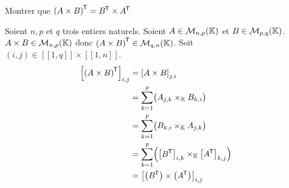 \documentclass{article}
\date{02 Janvier 2025}
\begin{document}
\maketitle

	{Montrer que $\left(A \times B\right)^{\mkern-1.5mu\mathsf{T}} = B^{\mkern-1.5mu\mathsf{T}} \times A^{\mkern-1.5mu\mathsf{T}}$}

	Soient $n,p$ et $q$ trois entiers naturels.
	Soient $A \in \mathcal{M}_{n,p}(\mathbb K)$ et $B\in \mathcal{M}_{p,q}(\mathbb K)$. \\
	$A \times B \in \mathcal{M}_{n,p}(\mathbb K)$ donc $\left(A \times B\right)^{\mkern-1.5mu\mathsf{T}} \in \mathcal{M}_{q,n}(\mathbb K)$.
	Soit $(i, j) \in [\![1,q]\!] \!\times\! [\![1,n]\!]$.
	\begin{equation*}
		\begin{aligned}
			\left[ \left(A \times B\right)^{\mkern-1.5mu\mathsf{T}} \right]_{i,j}
			 & = \left[A \times B\right]_{j,i}                                                               \\
			 & = \sum_{k=1}^{p}\bigl(A_{j,k} \times_{\mathbb K} B_{k,i}\bigr)                                         \\
			 & = \sum_{k=1}^{p}\bigl(B_{k,i} \times_{\mathbb K} A_{j,k}\bigr)                                         \\
			 & = \sum_{k=1}^{p}\Bigl(\left[B^{\mkern-1.5mu\mathsf{T}}\right]_{i,k} \times_{\mathbb K} \left[A^{\mkern-1.5mu\mathsf{T}}\right]_{k,j}\Bigr) \\
			 & = \left[ \left(B^{\mkern-1.5mu\mathsf{T}}\right) \times \left(A^{\mkern-1.5mu\mathsf{T}}\right) \right]_{i,j}
		\end{aligned}
	\end{equation*}
\end{question_kholle}
\end{document}
